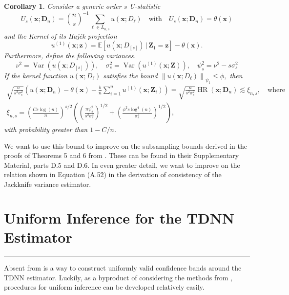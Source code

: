 \documentclass[letterpaper,10pt]{article}
\numberwithin{equation}{section}
\numberwithin{thm}{section}
\newtheorem{cor}{Corollary}
\newcommand{\1}{\mathbb{1}}
\begin{document}
\vspace{0.5cm}
\begin{cor}
	Consider a generic order $s$ U-statistic
	\begin{equation}
		U_{s}(\mathbf{x}; \mathbf{D}_n)
		= \binom{n}{s}^{-1} \sum_{\ell \in L_{n,s}}u(\mathbf{x}; D_{\ell})
		\quad \text{with} \quad
		U_{s}(\mathbf{x}; \mathbf{D}_n) = \theta(\mathbf{x})
	\end{equation}
	and the Kernel of its Haj\'ek projection
	\begin{equation}
		u^{(1)}\left(\mathbf{x}; \mathbf{z}\right)
		= \mathbb{E}\left[u(\mathbf{x}; D_{[s]}) \, | \, \mathbf{Z}_1 = \mathbf{z}\right] - \theta(\mathbf{x}).
	\end{equation}
	Furthermore, define the following variances.
	\begin{equation}
		\nu^2 = \operatorname{Var}\left(u(\mathbf{x}; D_{[s]})\right), \quad
		\sigma_{s}^2 = \operatorname{Var}\left(u^{(1)}(\mathbf{x}; \mathbf{Z})\right), \quad
		\psi_{s}^2 = \nu^2 - s \sigma_{s}^2
	\end{equation}
	If the kernel function $u\left(\mathbf{x} ; D_{\ell}\right)$ satisfies the bound
	$\left\|u(\mathbf{x}; D_{\ell})\right\|_{\psi_1} \leq \phi,$
	then
	\begin{align}
		\sqrt{\frac{n}{{s}^2 \sigma_{s}^2}}
		\left(u(\mathbf{x}; \mathbf{D}_n) - \theta(\mathbf{x}) - \frac{b}{n} \sum_{i=1}^n u^{(1)}(\mathbf{x}; \mathbf{Z}_{i})\right)
		= \sqrt{\frac{n}{{s}^2 \sigma_{s}^2}} \operatorname{HR}(\mathbf{x}; \mathbf{D}_n)
		\lesssim \xi_{n, s},
		\quad \text {where} \\
		\xi_{n, s}
		= \left(\frac{C s \log(n)}{n}\right)^{s / 2}\left(\left(\frac{n \psi_{s}^2}{{s}^2 \sigma_{s}^2}\right)^{1 / 2}+\left(\frac{\phi^2 s \log ^4(n)}{\sigma_{s}^2}\right)^{1 / 2}\right),
	\end{align}
	with probability greater than $1-C / n$.
\end{cor}

We want to use this bound to improve on the subsampling bounds derived in the proofs of Theorems 5 and 6 from \cite{demirkaya_optimal_2024}.
These can be found in their Supplementary Material, parts D.5 and D.6.
	{\color{red} In even greater detail, we want to improve on the relation shown in Equation (A.52) in the derivation of consistency of the Jackknife variance estimator.}



\newpage
\section{Uniform Inference for the TDNN Estimator}\label{UnifInf}
\hrule
Absent from \citet{demirkaya_optimal_2024} is a way to construct uniformly valid confidence bands around the TDNN estimator.
Luckily, as a byproduct of considering the methods from \citet{ritzwoller_uniform_2024}, procedures for uniform inference can be developed relatively easily.
\end{document}

